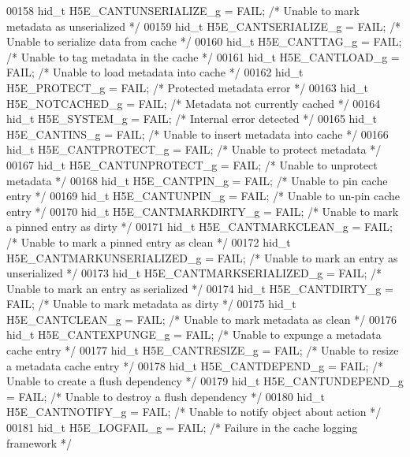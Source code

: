 \begin{DoxyCode}
00158 hid\_t H5E\_CANTUNSERIALIZE\_g = FAIL;      \textcolor{comment}{/* Unable to mark metadata as unserialized */}
00159 hid\_t H5E\_CANTSERIALIZE\_g  = FAIL;      \textcolor{comment}{/* Unable to serialize data from cache */}
00160 hid\_t H5E\_CANTTAG\_g        = FAIL;      \textcolor{comment}{/* Unable to tag metadata in the cache */}
00161 hid\_t H5E\_CANTLOAD\_g       = FAIL;      \textcolor{comment}{/* Unable to load metadata into cache */}
00162 hid\_t H5E\_PROTECT\_g        = FAIL;      \textcolor{comment}{/* Protected metadata error */}
00163 hid\_t H5E\_NOTCACHED\_g      = FAIL;      \textcolor{comment}{/* Metadata not currently cached */}
00164 hid\_t H5E\_SYSTEM\_g         = FAIL;      \textcolor{comment}{/* Internal error detected */}
00165 hid\_t H5E\_CANTINS\_g        = FAIL;      \textcolor{comment}{/* Unable to insert metadata into cache */}
00166 hid\_t H5E\_CANTPROTECT\_g    = FAIL;      \textcolor{comment}{/* Unable to protect metadata */}
00167 hid\_t H5E\_CANTUNPROTECT\_g  = FAIL;      \textcolor{comment}{/* Unable to unprotect metadata */}
00168 hid\_t H5E\_CANTPIN\_g        = FAIL;      \textcolor{comment}{/* Unable to pin cache entry */}
00169 hid\_t H5E\_CANTUNPIN\_g      = FAIL;      \textcolor{comment}{/* Unable to un-pin cache entry */}
00170 hid\_t H5E\_CANTMARKDIRTY\_g  = FAIL;      \textcolor{comment}{/* Unable to mark a pinned entry as dirty */}
00171 hid\_t H5E\_CANTMARKCLEAN\_g  = FAIL;      \textcolor{comment}{/* Unable to mark a pinned entry as clean */}
00172 hid\_t H5E\_CANTMARKUNSERIALIZED\_g = FAIL;      \textcolor{comment}{/* Unable to mark an entry as unserialized */}
00173 hid\_t H5E\_CANTMARKSERIALIZED\_g = FAIL;      \textcolor{comment}{/* Unable to mark an entry as serialized */}
00174 hid\_t H5E\_CANTDIRTY\_g      = FAIL;      \textcolor{comment}{/* Unable to mark metadata as dirty */}
00175 hid\_t H5E\_CANTCLEAN\_g      = FAIL;      \textcolor{comment}{/* Unable to mark metadata as clean */}
00176 hid\_t H5E\_CANTEXPUNGE\_g    = FAIL;      \textcolor{comment}{/* Unable to expunge a metadata cache entry */}
00177 hid\_t H5E\_CANTRESIZE\_g     = FAIL;      \textcolor{comment}{/* Unable to resize a metadata cache entry */}
00178 hid\_t H5E\_CANTDEPEND\_g     = FAIL;      \textcolor{comment}{/* Unable to create a flush dependency */}
00179 hid\_t H5E\_CANTUNDEPEND\_g   = FAIL;      \textcolor{comment}{/* Unable to destroy a flush dependency */}
00180 hid\_t H5E\_CANTNOTIFY\_g     = FAIL;      \textcolor{comment}{/* Unable to notify object about action */}
00181 hid\_t H5E\_LOGFAIL\_g        = FAIL;      \textcolor{comment}{/* Failure in the cache logging framework */}

\end{DoxyCode}
